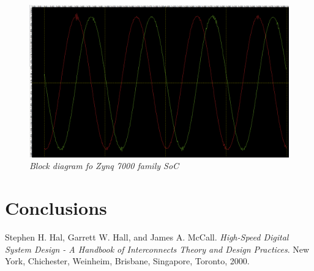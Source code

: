 \documentclass[en,printmode]{mgr}
\begin{document}
		\begin{figure}[!htb]
    			\centering
   				\includegraphics[width=\textwidth]{plots/chip_sine_corr.png}
   			 	\caption{\textit{Block diagram fo Zynq 7000 family SoC}}
		\end{figure}
	
\chapter{ Conclusions}



\begin{thebibliography}{9}
Stephen H. Hal, Garrett W. Hall, and James A. McCall. 
\textit{High-Speed Digital System Design - A Handbook of Interconnects Theory and Design Practices}.
New York, Chichester, Weinheim, Brisbane, Singapore, Toronto, 2000.


\end{thebibliography}
\end{document}
